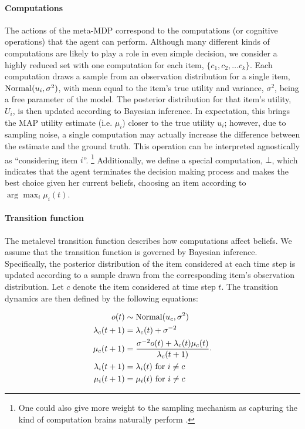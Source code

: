 \documentclass[12pt,a4paperpaper,]{article}
\begin{document}
\paragraph{Computations}
The actions of the meta-MDP correspond to the computations (or cognitive operations) that the agent can perform. Although many different kinds of computations are likely to play a role in even simple decision, we consider a highly reduced set with one computation for each item, $\{c_1, c_2, \dots c_k \}$. Each computation draws a sample from an observation distribution for a single item, $\mathrm{Normal}(u_i, \sigma^2)$, with mean equal to the item's true utility and variance, $\sigma^2$, being a free parameter of the model. The posterior distribution for that item's utility, $U_i$, is then updated according to Bayesian inference. In expectation, this brings the MAP utility estimate (i.e. $\mu_i$) closer to the true utility $u_i$; however, due to sampling noise, a single computation may actually increase the difference between the estimate and the ground truth. This operation can be interpreted agnostically as ``considering item $i$''.%
  \footnote{One could also give more weight to the sampling mechanism as capturing the kind of computation brains naturally perform \citep{sanborn16}.}
Additionally, we define a special computation, $\bot$, which indicates that the agent terminates the decision making process and makes the best choice given her current beliefs, choosing an item according to $\arg\max_i \mu_i(t)$.

\paragraph{Transition function}
The metalevel transition function describes how computations affect beliefs. We assume that the transition function is governed by Bayesian inference. Specifically, the posterior distribution of the item considered at each time step is updated according to a sample drawn from the corresponding item's observation distribution. Let $c$ denote the item considered at time step $t$. The transition dynamics are then defined by the following equations:

\begin{equation}
\begin{aligned}
  o(t) &\sim \mathrm{Normal}(u_{c}, \sigma^2) \\
  \lambda_c(t+1) &= \lambda_c(t) + \sigma^{-2}  \\
  \mu_{c}(t+1) &= \frac{\sigma^{-2} o(t) + \lambda_{c}(t) \mu_{c}(t)}{\lambda_{c}(t+1)}  \\
  \lambda_i(t+1) &= \lambda_i(t) \text{ for } i \neq c  \\
  \mu_i(t+1) &= \mu_i(t) \text{ for } i \neq c  \\
\end{aligned}
.
\end{equation}
\end{document}
